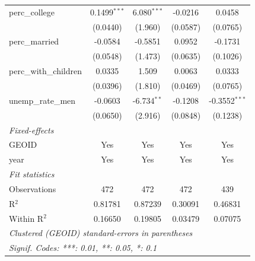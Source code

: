 \documentclass{article}
\begin{document}
\begin{appendices}
\begin{table}[ht]
{\begin{tabular}{lcccc}
   perc\_college                                         & 0.1499$^{***}$ & 6.080$^{***}$ & -0.0216  & 0.0458\\   
                                                         & (0.0440)       & (1.960)       & (0.0587) & (0.0765)\\   
   perc\_married                                         & -0.0584        & -0.5851       & 0.0952   & -0.1731\\   
                                                         & (0.0548)       & (1.473)       & (0.0635) & (0.1026)\\   
   perc\_with\_children                                  & 0.0335         & 1.509         & 0.0063   & 0.0333\\   
                                                         & (0.0396)       & (1.810)       & (0.0469) & (0.0765)\\   
   unemp\_rate\_men                                      & -0.0603        & -6.734$^{**}$ & -0.1208  & -0.3552$^{***}$\\   
                                                         & (0.0650)       & (2.916)       & (0.0848) & (0.1238)\\   
   \midrule
   \emph{Fixed-effects}\\
   GEOID                                                 & Yes            & Yes           & Yes      & Yes\\  
   year                                                  & Yes            & Yes           & Yes      & Yes\\  
   \midrule
   \emph{Fit statistics}\\
   Observations                                          & 472            & 472           & 472      & 439\\  
   R$^2$                                                 & 0.81781        & 0.87239       & 0.30091  & 0.46831\\  
   Within R$^2$                                          & 0.16650        & 0.19805       & 0.03479  & 0.07075\\  
   \midrule \midrule
   \multicolumn{5}{l}{\emph{Clustered (GEOID) standard-errors in parentheses}}\\
   \multicolumn{5}{l}{\emph{Signif. Codes: ***: 0.01, **: 0.05, *: 0.1}}\\
\end{tabular}}
\end{table}


\end{appendices}
\end{document}
